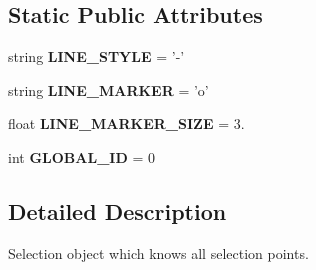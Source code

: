 \subsection*{Static Public Attributes}
\begin{DoxyCompactItemize}
\item 
\hypertarget{classModules_1_1Selection_1_1Selection_a398795a86e970eaab4681dd9ce0ebaad}{string {\bfseries L\-I\-N\-E\-\_\-\-S\-T\-Y\-L\-E} = '-\/'}\label{classModules_1_1Selection_1_1Selection_a398795a86e970eaab4681dd9ce0ebaad}

\item 
\hypertarget{classModules_1_1Selection_1_1Selection_aaf0d83659a4cc3373f2fc46bb9dcf4e6}{string {\bfseries L\-I\-N\-E\-\_\-\-M\-A\-R\-K\-E\-R} = 'o'}\label{classModules_1_1Selection_1_1Selection_aaf0d83659a4cc3373f2fc46bb9dcf4e6}

\item 
\hypertarget{classModules_1_1Selection_1_1Selection_a65a5135ca71ec79e8f87457df10d7737}{float {\bfseries L\-I\-N\-E\-\_\-\-M\-A\-R\-K\-E\-R\-\_\-\-S\-I\-Z\-E} = 3.}\label{classModules_1_1Selection_1_1Selection_a65a5135ca71ec79e8f87457df10d7737}

\item 
\hypertarget{classModules_1_1Selection_1_1Selection_a5558dc889352f0ffb27d585cfe920ebc}{int {\bfseries G\-L\-O\-B\-A\-L\-\_\-\-I\-D} = 0}\label{classModules_1_1Selection_1_1Selection_a5558dc889352f0ffb27d585cfe920ebc}

\end{DoxyCompactItemize}


\subsection{Detailed Description}
\begin{DoxyVerb}Selection object which knows all selection points.
\end{DoxyVerb}
 

